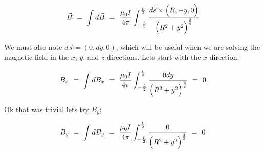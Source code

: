 \documentclass{article}
\begin{document}
\begin{equation} \label{eb-eq-51-5}
\vec{B} \hspace{0.125cm} = \hspace{0.125cm} \int d \vec{B} \hspace{0.125cm} = \hspace{0.125cm} \frac{\mu_{0} I}{4 \pi} \int_{-\frac{L}{2}}^{\frac{L}{2}} \frac{d \vec{s} \times \Big(R, -y, 0 \Big)}{\Big( R^2 + y^2 \Big)^\frac{3}{2}}
\end{equation}

We must also note \begin{math} d \vec{s} = (0, dy, 0) \end{math}, which will be useful when we are solving the magnetic field in the \begin{math} x \end{math}, \begin{math} y \end{math}, and \begin{math} z \end{math} directions. Lets start with the \begin{math} x \end{math} direction;

\begin{equation} \label{eb-eq-51-6}
B_x \hspace{0.125cm} = \hspace{0.125cm} \int d B_x \hspace{0.125cm} = \hspace{0.125cm} \frac{\mu_{0} I}{4 \pi} \int_{-\frac{L}{2}}^{\frac{L}{2}} \frac{0 dy}{\Big( R^2 + y^2 \Big)^\frac{3}{2}} \hspace{0.125cm} = \hspace{0.125cm} 0 
\end{equation}

Ok that was trivial lets try \begin{math} B_y \end{math};

\begin{equation} \label{eb-eq-51-7}
B_y \hspace{0.125cm} = \hspace{0.125cm} \int d B_y \hspace{0.125cm} = \hspace{0.125cm} \frac{\mu_{0} I}{4 \pi} \int_{-\frac{L}{2}}^{\frac{L}{2}} \frac{0}{\Big( R^2 + y^2 \Big)^\frac{3}{2}} \hspace{0.125cm} = \hspace{0.125cm} 0 
\end{equation}
\end{document}
